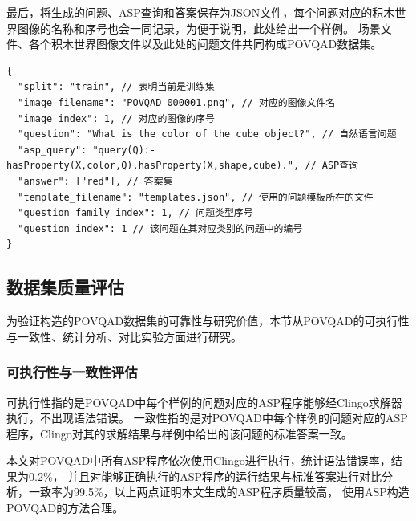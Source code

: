最后，将生成的问题、ASP查询和答案保存为JSON文件，每个问题对应的积木世界图像的名称和序号也会一同记录，为便于说明，此处给出一个样例。
场景文件、各个积木世界图像文件以及此处的问题文件共同构成POVQAD数据集。
\begin{lstlisting}
{
  "split": "train", // 表明当前是训练集
  "image_filename": "POVQAD_000001.png", // 对应的图像文件名
  "image_index": 1, // 对应的图像的序号
  "question": "What is the color of the cube object?", // 自然语言问题
  "asp_query": "query(Q):-hasProperty(X,color,Q),hasProperty(X,shape,cube).", // ASP查询
  "answer": ["red"], // 答案集
  "template_filename": "templates.json", // 使用的问题模板所在的文件
  "question_family_index": 1, // 问题类型序号
  "question_index": 1 // 该问题在其对应类别的问题中的编号
}
\end{lstlisting}
\subsection{数据集质量评估}
为验证构造的POVQAD数据集的可靠性与研究价值，本节从POVQAD的可执行性与一致性、统计分析、对比实验方面进行研究。
\subsubsection{可执行性与一致性评估}
可执行性指的是POVQAD中每个样例的问题对应的ASP程序能够经Clingo求解器执行，不出现语法错误。
一致性指的是对POVQAD中每个样例的问题对应的ASP程序，Clingo对其的求解结果与样例中给出的该问题的标准答案一致。

本文对POVQAD中所有ASP程序依次使用Clingo进行执行，统计语法错误率，结果为0.2\%，
并且对能够正确执行的ASP程序的运行结果与标准答案进行对比分析，一致率为99.5\%，以上两点证明本文生成的ASP程序质量较高，
使用ASP构造POVQAD的方法合理。
